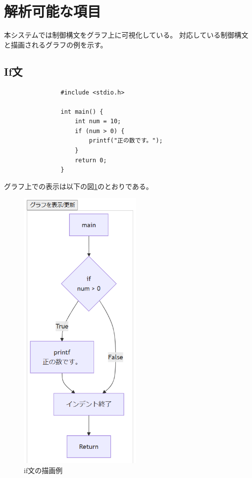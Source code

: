 \documentclass{cssspaper}
\begin{document}
        \section{解析可能な項目}
        本システムでは制御構文をグラフ上に可視化している。
        対応している制御構文と描画されるグラフの例を示す。

            \subsection{If文}
            \begin{lstlisting}
                #include <stdio.h>

                int main() {
                    int num = 10;
                    if (num > 0) {
                        printf("正の数です。");
                    }
                    return 0;
                }
            \end{lstlisting}

            グラフ上での表示は以下の図\ref{fig:if}のとおりである。

            \begin{figure}[h]
                \centering
                \includegraphics[width=6cm]{if.png}
                \caption{if文の描画例}
                \label{fig:if}
            \end{figure}
\end{document}
